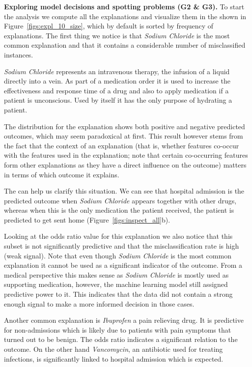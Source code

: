\noindent \textbf{Exploring model decisions and spotting problems (G2 \& G3).} %
To start the analysis we compute all the explanations and visualize them in the \tabB shown in Figure~\ref{figs:expl_10_size}, which by default is sorted by frequency of explanations. The first thing we notice is that \emph{Sodium Chloride} is the most common explanation and that it contains a considerable number of misclassified instances.

\emph{Sodium Chloride} represents an intravenous therapy, the infusion of a liquid directly into a vein. As part of a medication order it is used to increase the effectiveness and response time of a drug and also to apply medication if a patient is unconscious. Used by itself it has the only purpose of hydrating a patient.

The distribution for the explanation shows both positive and negative predicted outcomes, which may seem paradoxical at first. This result however stems from the fact that the context of an explanation (that is, whether features co-occur with the features used in the explanation; note that certain co-occurring features form other explanations as they have a direct influence on the outcome) matters in terms of which outcome it explains. 

The \tabC can help us clarify this situation. We can see that hospital admission is the predicted outcome when \emph{Sodium Chloride} appears together with other drugs, whereas when this is the only medication the patient received, the patient is predicted to get sent home (Figure~\ref{figs:inspect_all}b).


Looking at the odds ratio value for this explanation we also notice that this subset is not significantly predictive and that the misclassification rate is high (weak signal). Note that even though \emph{Sodium Chloride} is the most common explanation it cannot be used as a significant indicator of the outcome. From a medical perspective this makes sense as \emph{Sodium Chloride} is mostly used as supporting medication, however, the machine learning model still assigned predictive power to it. This indicates that the data did not contain a strong enough signal to make a more informed decision in those cases.


% 

Another common explanation is \emph{Ibuprofen} a pain relieving drug.
It is predictive for non-admissions which is likely due to patients with pain symptoms that turned out to be benign.
The odds ratio indicates a significant relation to the outcome.
On the other hand \emph{Vancomycin}, an antibiotic used for treating infections, is significantly linked to hospital admission which is expected.

